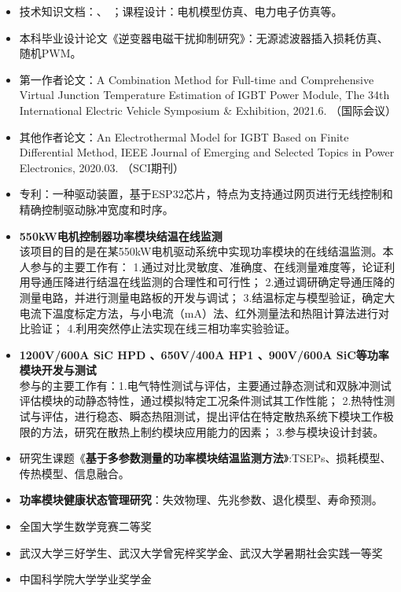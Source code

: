 \documentclass[zh]{resume}
\begin{document}
\begin{itemize}
  \item 技术知识文档：、
  ；课程设计：电机模型仿真、电力电子仿真等。
  \item 本科毕业设计论文《逆变器电磁干扰抑制研究》：无源滤波器插入损耗仿真、随机PWM。
  \item 第一作者论文：{\small A Combination Method for Full-time and Comprehensive Virtual Junction Temperature Estimation of IGBT Power Module, The 34th International Electric Vehicle Symposium \& Exhibition, 2021.6. （国际会议）}
  \item 其他作者论文：{\small An Electrothermal Model for IGBT Based on Finite Differential Method, IEEE Journal of Emerging and Selected Topics in Power Electronics, 2020.03. 
  （SCI期刊） }
  \item 专利：一种驱动装置，基于ESP32芯片，特点为支持通过网页进行无线控制和精确控制驱动脉冲宽度和时序。
\end{itemize}

\begin{itemize}
  \item \textbf{550kW电机控制器功率模块结温在线监测}\\
  {\small 该项目的目的是在某550kW电机驱动系统中实现功率模块的在线结温监测。本人参与的主要工作有：
  1.通过对比灵敏度、准确度、在线测量难度等，论证利用导通压降进行结温在线监测的合理性和可行性；
  2.通过调研确定导通压降的测量电路，并进行测量电路板的开发与调试；
  3.结温标定与模型验证，确定大电流下温度标定方法，与小电流（mA）法、红外测量法和热阻计算法进行对比验证；
  4.利用突然停止法实现在线三相功率实验验证。}
  \item \textbf{1200V/600A SiC HPD 、650V/400A HP1 、900V/600A SiC等功率模块开发与测试}\\
  {\small 参与的主要工作有：1.电气特性测试与评估，主要通过静态测试和双脉冲测试评估模块的动静态特性，通过模拟特定工况条件测试其工作性能；
  2.热特性测试与评估，进行稳态、瞬态热阻测试，提出评估在特定散热系统下模块工作极限的方法，研究在散热上制约模块应用能力的因素；
  3.参与模块设计封装。}
  \item 研究生课题《\textbf{基于多参数测量的功率模块结温监测方法}》:TSEPs、损耗模型、传热模型、信息融合。
  \item \textbf{功率模块健康状态管理研究}：失效物理、先兆参数、退化模型、寿命预测。
  
\end{itemize}

\begin{itemize}
  \item 全国大学生数学竞赛二等奖
  \item 武汉大学三好学生、武汉大学曾宪梓奖学金、武汉大学暑期社会实践一等奖
  \item 中国科学院大学学业奖学金
\end{itemize}
\end{document}
